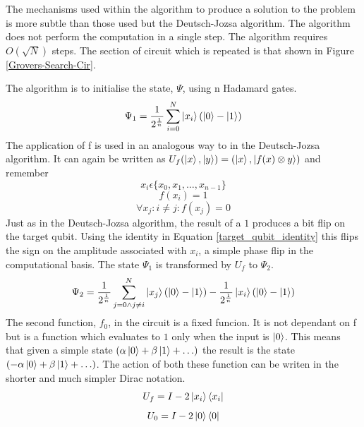 \documentclass[authoryearcitations]{UoYCSproject}
\begin{document}
The mechanisms used within the algorithm to produce a solution to the problem is more subtle than those used but the Deutsch-Jozsa algorithm.
The algorithm does not perform the computation in a single step.
The algorithm requires $O(\sqrt{N})$ steps.
The section of circuit which is repeated is that shown in Figure \ref{Grovers-Search-Cir}.

The algorithm is to initialise the state, $\Psi$, using n Hadamard gates.
\begin{equation}
\Psi_1=\frac{1}{2^{\frac{1}{n}}}\sum\limits_{i=0}^N \left\vert{x_i}\right\rangle(\left\vert{0}\right\rangle-\left\vert{1}\right\rangle)
\end{equation}
The application of f is used in an analogous way to in the Deutsch-Jozsa algorithm.
It can again be written as $U_f(\left\vert{x}\right\rangle,\left\vert{y}\right\rangle)=(\left\vert{x}\right\rangle,\left\vert{f(x)\otimes{y}}\right\rangle)$ and remember
\begin{equation}
x_i\epsilon\{x_0,x_1,\ldots,x_{n-1}\}
\end{equation}
\begin{equation}
f(x_i)=1
\end{equation}
\begin{equation}
\forall{x_j} : i\neq{j} : f(x_j)=0
\end{equation}
Just as in the Deutsch-Jozsa algorithm, the result of a $1$ produces a bit flip on the target qubit.
Using the identity in Equation \ref{target_qubit_identity} this flips the sign on the amplitude associated with $x_i$, a simple phase flip in the computational basis.
The state $\Psi_1$ is transformed by $U_f$ to $\Psi_2$.
\begin{equation}
\Psi_2=\frac{1}{2^{\frac{1}{n}}}\sum\limits_{j=0\wedge{j}\neq{i}}^N \left\vert{x_j}\right\rangle(\left\vert{0}\right\rangle-\left\vert{1}\right\rangle) - \frac{1}{2^{\frac{1}{n}}} \left\vert{x_i}\right\rangle(\left\vert{0}\right\rangle-\left\vert{1}\right\rangle)
\end{equation}
The second function, $f_0$, in the circuit is a fixed funcion.
It is not dependant on f but is a function which evaluates to $1$ only when the input is $\left\vert{0}\right\rangle$.
This means that given a simple state $(\alpha\left\vert{0}\right\rangle+\beta\left\vert{1}\right\rangle+\ldots)$ the result is the state $(-\alpha\left\vert{0}\right\rangle+\beta\left\vert{1}\right\rangle+\ldots)$.
The action of both these function can be writen in the shorter and much simpler Dirac notation.
\begin{equation}
U_f=I-2\left\vert{x_i}\right\rangle\left\langle{x_i}\right\vert
\end{equation}
\begin{equation}
U_0=I-2\left\vert{0}\right\rangle\left\langle{0}\right\vert
\label{Grover:U_0_dirac}
\end{equation}
\end{document}
